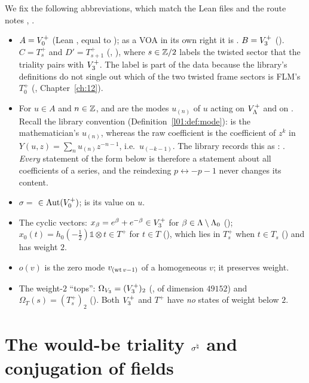 We fix the following abbreviations, which match the Lean files and the route notes
, .
\begin{itemize}
\item $A=V_0^{+}$ (Lean , equal to ); as a VOA in its own
  right it is .  $B=V_3^{+}$ ().  $C=T_s^+$ and $D'=T_{s+1}^+$
  (, ), where $s\in{\mathbb{Z}}/2$ labels the twisted sector that the
  triality pairs with $V_3^{+}$.  The label is part of the data because the library's definitions do
  not single out which of the two twisted frame sectors is FLM's $T_0^+$
  (, Chapter~\ref{ch:12}).
\item For $u\in A$ and $n\in{\mathbb{Z}}$,  and  are the modes $u_{(n)}$ of $u$
  acting on $V_{\Lambda}^+$ and on .  Recall the library convention
   (Definition~\ref{l01:def:mode}):  is the mathematician's
  $u_{(n)}$, whereas the raw coefficient  is the coefficient of $z^{k}$ in
  $Y(u,z)=\sum_n u_{(n)}z^{-n-1}$, i.e.\ $u_{(-k-1)}$.  The library records this as
  : .  \emph{Every} statement of the
  form  below is therefore a statement about all coefficients of a series, and
  the reindexing $p\leftrightarrow -p-1$ never changes its content.
\item $\sigma=$  $\in\operatorname{Aut}(V_0^{+})$;  is its value on $u$.
\item The cyclic vectors: $x_\beta=e^\beta+e^{-\beta}\in V_3^{+}$ for $\beta\in{\Lambda}\setminus{\Lambda}_0$
  (); $x_0(t)=h_0(-\tfrac12)\mathbb 1\otimes t\in T^+$ for $t\in T$
  (), which lies in $T_s^+$ when $t\in T_s$ () and has weight $2$.
\item $o(v)$ is the zero mode $v_{(\operatorname{wt} v-1)}$ of a homogeneous $v$; it preserves weight.
\item The weight-$2$ ``tops'': $\Omega_{V_3}=(V_3^{+})_2$ (, of dimension $49152$) and
  $\Omega_T(s)=(T_s^+)_2$ ().  Both $V_3^{+}$ and $T^+$ have \emph{no} states of weight
  below $2$.
\end{itemize}

\section{\texorpdfstring{The would-be triality $\sigma^{\natural}$ and conjugation of fields}{The would-be triality sigma-natural and conjugation of fields}}\label{ch14:sec:conj}

